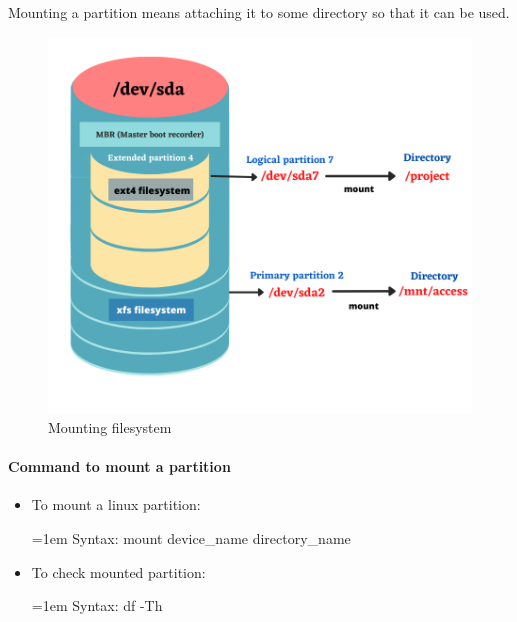 \setlength{\columnsep}{3pt}
\begin{flushleft}
	

		Mounting a partition means attaching it to some directory so that it can be used. 
		
		\begin{figure}[h!]
			\centering
			\includegraphics[scale=.6]{content/chapter8/images/new.png}
			\caption{Mounting filesystem}
			\label{mounting}
		\end{figure}	
	
	\newpage
	\paragraph{Command to mount a partition}
		\begin{itemize}		
		\item To mount a linux partition:
		\bigskip
		\begin{tcolorbox}[breakable,notitle,boxrule=-0pt,colback=pink,colframe=pink]
			\color{black}
			\font=1em
			Syntax: mount device\_name directory\_name
			\font=4pt
		\end{tcolorbox}
		
		\item To check mounted partition:
		\bigskip
		\begin{tcolorbox}[breakable,notitle,boxrule=-0pt,colback=pink,colframe=pink]
			\color{black}
			\font=1em
			Syntax: df -Th
			\font=4pt
		\end{tcolorbox}
		

\end{itemize}
\end{flushleft}
